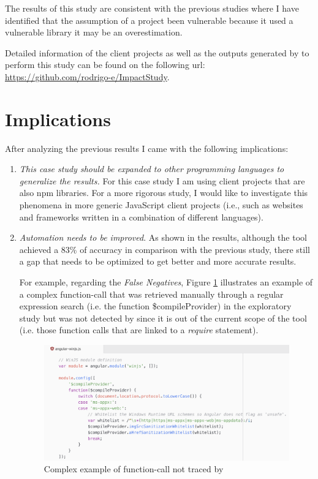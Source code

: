 The results of this study are consistent with the previous studies where I have identified that the assumption of a project been vulnerable because it used a vulnerable library it may be an overestimation.

Detailed information of the client projects as well as the outputs generated by \tool[] to perform this study can be found on the following url: \url{https://github.com/rodrigo-e/ImpactStudy}.


\section{Implications}

After analyzing the previous results I came with the following implications:
\begin{enumerate}
    \item \textit{This case study should be expanded to other programming languages to generalize the results.}
    For this case study I am using client projects that are also npm libraries. 
    For a more rigorous study, I would like to investigate this phenomena in more generic JavaScript client projects (i.e., such as websites and frameworks written in a combination of different languages).
    
    \item \textit{Automation needs to be improved}. As shown in the results, although the tool achieved a 83\% of accuracy in comparison with the previous study, there still a gap that needs to be optimized to get better and more accurate results.
    
    For example, regarding the \textit{False Negatives}, Figure \ref{fig:falseNegativeExample} illustrates an example of a complex function-call that was retrieved manually through a regular expression search (i.e. the function \$compileProvider) in the exploratory study but was not detected by \tool[] since it is out of the current scope of the tool (i.e. those function calls that are linked to a \textit{require} statement).

\begin{figure}[ht]
\centering
\includegraphics[width=1\textwidth]{images/false_negatives_reason.png}
\caption{Complex example of function-call not traced by \tool[]}
\label{fig:falseNegativeExample}
\end{figure}
    

\end{enumerate}
